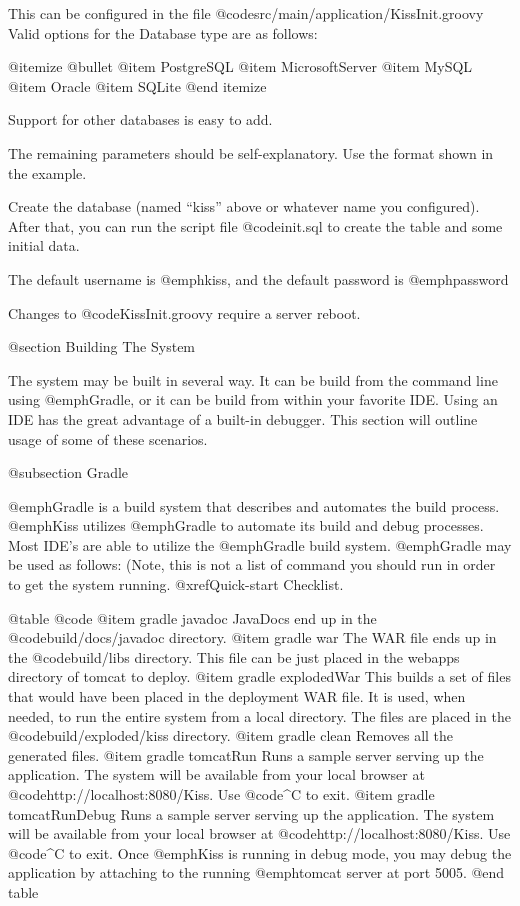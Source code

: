 This can be configured in the file @code{src/main/application/KissInit.groovy}
Valid options for the Database type are as follows:

@itemize @bullet
@item
PostgreSQL
@item
MicrosoftServer
@item
MySQL
@item
Oracle
@item
SQLite
@end itemize

Support for other databases is easy to add.

The remaining parameters should be self-explanatory.  Use the format
shown in the example.

Create the database (named ``kiss'' above or whatever name you
configured).  After that, you can run the script file @code{init.sql}
to create the table and some initial data.

The default username is @emph{kiss}, and the default password is
@emph{password}

Changes to  @code{KissInit.groovy} require a server reboot.

@section Building The System

The system may be built in several way.  It can be build from the
command line using @emph{Gradle}, or it can be build from within your
favorite IDE.  Using an IDE has the great advantage of a built-in
debugger.  This section will outline usage of some of these scenarios.

@subsection Gradle 

@emph{Gradle} is a build system that describes and automates the build process.
@emph{Kiss} utilizes @emph{Gradle} to automate its build and debug processes.
Most IDE's are able to utilize the @emph{Gradle} build system.
@emph{Gradle} may be used as follows:
(Note, this is not a list of command you should run in order to get the system running.  
@xref{Quick-start Checklist}.

@table @code
@item gradle javadoc
JavaDocs end up in the @code{build/docs/javadoc} directory.
@item gradle war
The WAR file ends up in the @code{build/libs} directory.  
This file can be just placed in the webapps directory of tomcat to deploy.
@item gradle explodedWar
This builds a set of files that would have been placed in the deployment WAR file.  It is used, when needed,
to run the entire system from a local directory.  The files are placed in the @code{build/exploded/kiss}
directory.
@item gradle clean
Removes all the generated files.
@item gradle tomcatRun
Runs a sample server serving up the application.  The system will be
available from your local browser at
@code{http://localhost:8080/Kiss}.  Use @code{^C} to exit.
@item gradle tomcatRunDebug
Runs a sample server serving up the application.  The system will be
available from your local browser at
@code{http://localhost:8080/Kiss}.  Use @code{^C} to exit. Once @emph{Kiss} is running in debug mode,
you may debug the application by attaching to the running @emph{tomcat} server at port 5005.
@end table

